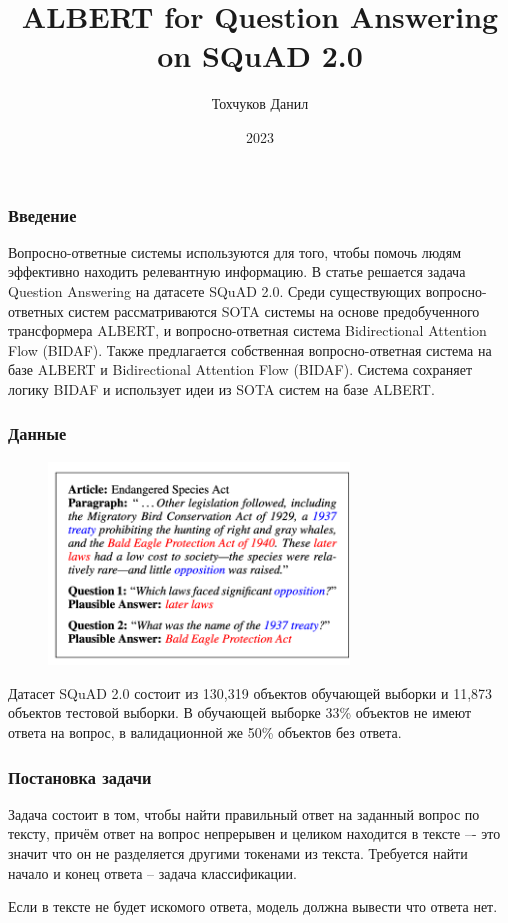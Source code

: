 \documentclass[xcolor={dvipsnames}]{beamer}
\title[ALBERT for SQuAD 2.0] %
{ALBERT for Question Answering on SQuAD 2.0}
\author[Тохчуков Данил] %
{Тохчуков Данил}
\institute[Institute] %
{
    Факультет вычислительной математики и кибернетики\\
    МГУ имени М. В. Ломоносова
}
\date[Article 2023] %
{2023}
\begin{document}
\frame{\titlepage}



\begin{frame}
\frametitle{Введение}

\begin{center}
    Вопросно-ответные системы используются для того, чтобы помочь людям эффективно находить релевантную информацию.
    В статье решается задача Question Answering на датасете SQuAD 2.0.
    Среди существующих вопросно-ответных систем рассматриваются SOTA системы на основе предобученного трансформера ALBERT, и вопросно-ответная система Bidirectional Attention Flow (BIDAF). Также предлагается собственная вопросно-ответная система на базе ALBERT и Bidirectional Attention Flow (BIDAF). Система сохраняет логику BIDAF и использует идеи из SOTA систем на базе ALBERT.
\end{center}

\end{frame}

\begin{frame}
\frametitle{Данные}

\begin{figure}[!ht]
    \centering
    \includegraphics[width=80mm]{../figures/squad_example.png}
\end{figure}

Датасет SQuAD 2.0 состоит из 130,319 объектов обучающей выборки и 11,873 объектов тестовой выборки. В обучающей выборке 33\% объектов не имеют ответа на вопрос, в валидационной же 50\% объектов без ответа.

\end{frame}

\begin{frame}
\frametitle{Постановка задачи}
Задача состоит в том, чтобы найти правильный ответ на заданный вопрос по тексту, причём ответ на
вопрос непрерывен и целиком находится в тексте –- это значит что он не разделяется другими токенами
из текста. Требуется найти начало и конец ответа -- задача классификации.

Если в тексте не будет искомого ответа, модель должна вывести что ответа нет.

\end{frame}
\end{document}

